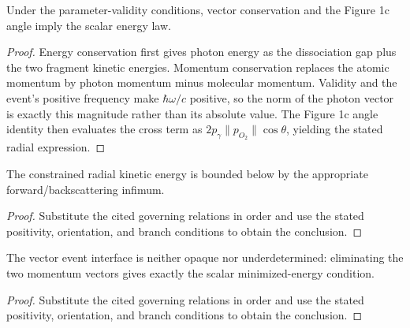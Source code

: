 \begin{lemma}
  \label{lem:physics:IPhO_2026_1_C_1:aux016}
  Under the parameter-validity conditions, vector conservation and the
  Figure 1c angle imply the scalar energy law.
\end{lemma}
\begin{proof}
  Energy conservation first gives photon energy as the dissociation gap plus
  the two fragment kinetic energies.  Momentum conservation replaces the
  atomic momentum by photon momentum minus molecular momentum.  Validity and
  the event's positive frequency make \(\hbar\omega/c\) positive, so the norm
  of the photon vector is exactly this magnitude rather than its absolute
  value.  The Figure 1c angle identity then evaluates the cross term as
  \(2p_\gamma\lVert p_{O_2}\rVert\cos\theta\), yielding the stated radial
  expression.
\end{proof}

\begin{lemma}
  \label{lem:physics:IPhO_2026_1_C_1:aux017}
  The constrained radial kinetic energy is bounded below by the appropriate forward/backscattering infimum.
\end{lemma}
\begin{proof}
  Substitute the cited governing relations in order and use the stated positivity, orientation, and branch conditions to obtain the conclusion.
\end{proof}

\begin{lemma}
  \label{lem:physics:IPhO_2026_1_C_1:aux018}
  The vector event interface is neither opaque nor underdetermined: eliminating the two momentum vectors gives exactly the scalar minimized-energy condition.
\end{lemma}
\begin{proof}
  Substitute the cited governing relations in order and use the stated positivity, orientation, and branch conditions to obtain the conclusion.
\end{proof}

